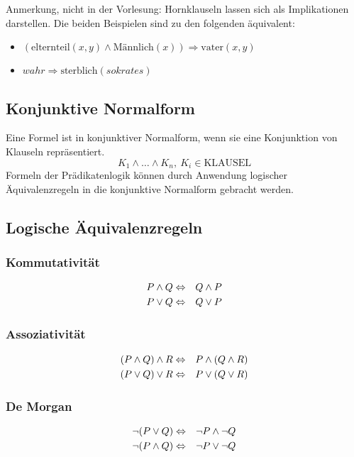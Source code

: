 \documentclass[a4paper,twoside,DIV15,BCOR12mm]{scrbook}
\begin{document}
Anmerkung, nicht in der Vorlesung: Hornklauseln lassen sich als Implikationen darstellen. Die beiden Beispielen sind zu den folgenden äquivalent:

\begin{itemize}
\item $(\text{elternteil}(x,y) \wedge \text{Männlich}(x)) \Rightarrow \text{vater}(x,y)$
\item $wahr \Rightarrow \text{sterblich}(sokrates)$
\end{itemize}

\subsection{Konjunktive Normalform}
Eine Formel ist in konjunktiver Normalform, wenn sie eine Konjunktion von Klauseln repräsentiert.
$$K_1 \wedge \ldots \wedge K_n,\ K_i \in \text{KLAUSEL}$$
Formeln der Prädikatenlogik können durch Anwendung logischer Äquivalenzregeln in die konjunktive Normalform gebracht werden.

\subsection{Logische Äquivalenzregeln}
\subsubsection{Kommutativität}
\begin{eqnarray*}
 P \wedge Q & \Leftrightarrow & Q \wedge P \\
 P \vee Q & \Leftrightarrow & Q \vee P 
\end{eqnarray*}

\subsubsection{Assoziativität}
\begin{eqnarray*}
	(P \wedge Q) \wedge R & \Leftrightarrow & P \wedge (Q \wedge R) \\
	(P \vee Q) \vee R & \Leftrightarrow & P \vee (Q \vee R)
\end{eqnarray*}

\subsubsection{De Morgan}
\begin{eqnarray*}
	\neg(P \vee Q)   & \Leftrightarrow & \neg P \wedge \neg Q \\
	\neg(P \wedge Q) & \Leftrightarrow & \neg P \vee \neg Q 
\end{eqnarray*}
\end{document}
